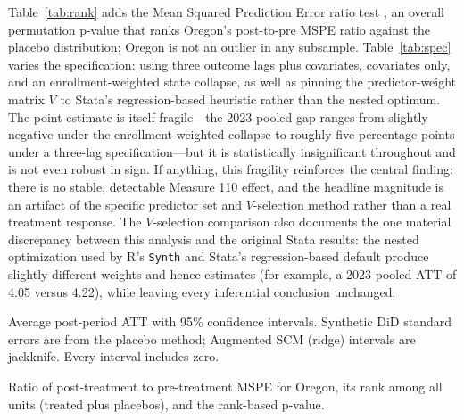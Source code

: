 \documentclass[12pt]{article}
\begin{document}
Table~\ref{tab:rank} adds the Mean Squared Prediction Error ratio test
\cite{abadie2010synthetic}, an overall permutation p-value that ranks Oregon's
post-to-pre MSPE ratio against the placebo distribution; Oregon is not an
outlier in any subsample. Table~\ref{tab:spec} varies the specification: using
three outcome lags plus covariates, covariates only, and an
enrollment-weighted state collapse, as well as pinning the predictor-weight
matrix $V$ to Stata's regression-based heuristic rather than the nested
optimum. The point estimate is itself fragile---the 2023 pooled gap ranges
from slightly negative under the enrollment-weighted collapse to roughly five
percentage points under a three-lag specification---but it is statistically
insignificant throughout and is not even robust in sign. If anything, this
fragility reinforces the central finding: there is no stable, detectable
Measure 110 effect, and the headline magnitude is an artifact of the specific
predictor set and $V$-selection method rather than a real treatment response.
The $V$-selection comparison also documents the one material discrepancy
between this analysis and the original Stata results: the nested optimization
used by R's \texttt{Synth} and Stata's regression-based default produce
slightly different weights and hence estimates (for example, a 2023 pooled ATT
of 4.05 versus 4.22), while leaving every inferential conclusion unchanged.

\begin{table}[htbp]
\centering
\caption{Alternative Estimators: Synthetic DiD and Augmented SCM}
\label{tab:altest}

\begin{minipage}{0.9\textwidth}
\vspace{4pt}
\footnotesize
Average post-period ATT with 95\% confidence intervals. Synthetic DiD standard
errors are from the placebo method; Augmented SCM (ridge) intervals are
jackknife. Every interval includes zero.
\end{minipage}
\end{table}

\begin{table}[htbp]
\centering
\caption{MSPE-Ratio Permutation Test}
\label{tab:rank}

\begin{minipage}{0.9\textwidth}
\vspace{4pt}
\footnotesize
Ratio of post-treatment to pre-treatment MSPE for Oregon, its rank among all
units (treated plus placebos), and the rank-based p-value.
\end{minipage}
\end{table}
\end{document}
